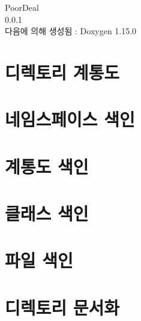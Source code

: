 \documentclass[twoside]{book}
\newcommand{\+}{\discretionary{\mbox{\scriptsize$\hookleftarrow$}}{}{}}
\newcommand{\clearemptydoublepage}{%
    \newpage{\pagestyle{empty}\cleardoublepage}%
  }
\begin{document}
  \raggedbottom
    \hypersetup{pageanchor=false,
                bookmarksnumbered=true,
                pdfencoding=unicode
               }
  \begin{titlepage}
  \vspace*{7cm}
  \begin{center}%
  {\Large Poor\+Deal}\\
  [1ex]\large 0.\+0.\+1 \\
  \vspace*{1cm}
  {\large 다음에 의해 생성됨 \+:  Doxygen 1.15.0}\\
  \end{center}
  \end{titlepage}
  \clearemptydoublepage
  \tableofcontents
  \clearemptydoublepage
  \hypersetup{pageanchor=true}
\chapter{디렉토리 계통도}

\chapter{네임스페이스 색인}

\chapter{계통도 색인}

\chapter{클래스 색인}

\chapter{파일 색인}

\chapter{디렉토리 문서화}











\end{document}
